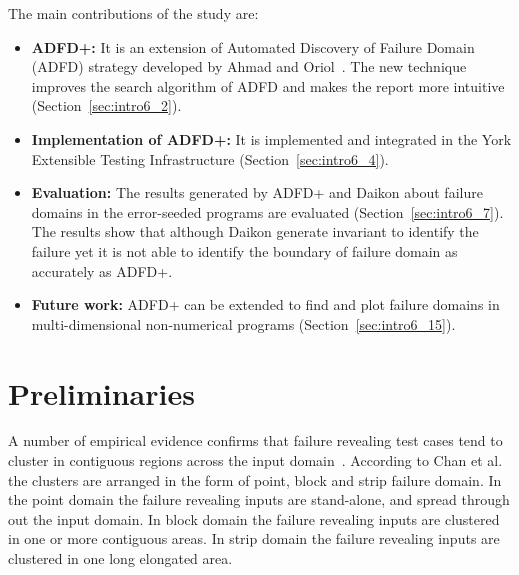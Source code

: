 The main contributions of the study are:
\begin{itemize}
\item \textbf{ADFD+:} It is an extension of Automated Discovery of Failure Domain (ADFD) strategy developed by Ahmad and Oriol~\cite{ahmad2013adfd}. The new technique improves the search algorithm of ADFD and makes the report more intuitive (Section~\ref{sec:intro6_2}).
\item \textbf{Implementation of ADFD+:} It is implemented and integrated in the York Extensible Testing Infrastructure (Section~\ref{sec:intro6_4}).
\item \textbf{Evaluation:} The results generated by ADFD+ and Daikon about failure domains in the error-seeded programs are evaluated (Section~\ref{sec:intro6_7}). The results show that although Daikon generate invariant to identify the failure yet it is not able to identify the boundary of failure domain as accurately as ADFD+. 
\item \textbf{Future work:} ADFD+ can be extended to find and plot failure domains in multi-dimensional non-numerical programs (Section~\ref{sec:intro6_15}).
\end{itemize}




\section{Preliminaries}\label{sec:intro6_1}
A number of empirical evidence confirms that failure revealing test cases tend to cluster in contiguous regions across the input domain~\cite{finelli1991nasa, schneckenburger2007towards, white1980domain}. According to Chan et al.~\cite{chan1996proportional} the clusters are arranged in the form of point, block and strip failure domain. In the point domain the failure revealing inputs are stand-alone, and spread through out the input domain. In block domain the failure revealing inputs are clustered in one or more contiguous areas. In strip domain the failure revealing inputs are clustered in one long elongated area. 

